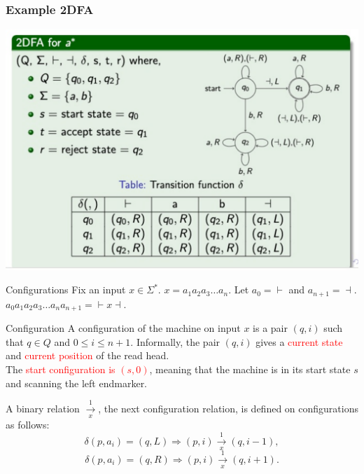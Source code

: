 \documentclass{beamer}
\begin{document}
\begin{frame}
\frametitle{Example 2DFA}
 \centering
        \includegraphics[width=1.0\textwidth]{Screenshot 2024-03-15 at 6.08.48 PM copy.pdf}
    
\end{frame}

\begin{frame}{Configurations }
Fix an input $x \in \Sigma^{*}$. $x = a_{1}a_{2}a_{3} \ldots a_{n}$. Let $a_{0} = \vdash$ and $a_{n+1} = \dashv$. \\
$a_0a_1a_2a_3 \ldots a_n a_{n+1} = \vdash x \dashv$. \\
\begin{block}{Configuration}
A configuration of the machine on input $x$ is a pair $(q, i)$ such that $q \in Q$ and $0 \leq i \leq n + 1$. Informally, the pair $(q, i)$ gives a \textcolor{red}{current state} and \textcolor{red}{current position} of the read head. \\
The \textcolor{red}{start configuration is $(s, 0)$}, meaning that the machine is in its start state $s$ and scanning the left endmarker.
\end{block}
A binary relation $\xrightarrow[x]{1}$, the next configuration relation, is defined on configurations as follows:
\[
\delta(p, a_i) = (q, L) \Rightarrow (p, i) \xrightarrow[x]{1} (q, i - 1),
\]
\[
\delta(p, a_i) = (q, R) \Rightarrow (p, i) \xrightarrow[x]{1} (q, i + 1).
\]
\end{frame}
\end{document}
